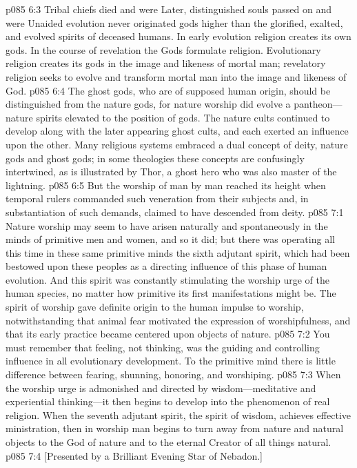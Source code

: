 \vs p085 6:3 Tribal chiefs died and were  Later, distinguished souls passed on and were  Unaided evolution never originated gods higher than the glorified, exalted, and evolved spirits of deceased humans. In early evolution religion creates its own gods. In the course of revelation the Gods formulate religion. Evolutionary religion creates its gods in the image and likeness of mortal man; revelatory religion seeks to evolve and transform mortal man into the image and likeness of God.
\vs p085 6:4 The ghost gods, who are of supposed human origin, should be distinguished from the nature gods, for nature worship did evolve a pantheon---nature spirits elevated to the position of gods. The nature cults continued to develop along with the later appearing ghost cults, and each exerted an influence upon the other. Many religious systems embraced a dual concept of deity, nature gods and ghost gods; in some theologies these concepts are confusingly intertwined, as is illustrated by Thor, a ghost hero who was also master of the lightning.
\vs p085 6:5 But the worship of man by man reached its height when temporal rulers commanded such veneration from their subjects and, in substantiation of such demands, claimed to have descended from deity.
\vs p085 7:1 Nature worship may seem to have arisen naturally and spontaneously in the minds of primitive men and women, and so it did; but there was operating all this time in these same primitive minds the sixth adjutant spirit, which had been bestowed upon these peoples as a directing influence of this phase of human evolution. And this spirit was constantly stimulating the worship urge of the human species, no matter how primitive its first manifestations might be. The spirit of worship gave definite origin to the human impulse to worship, notwithstanding that animal fear motivated the expression of worshipfulness, and that its early practice became centered upon objects of nature.
\vs p085 7:2 You must remember that feeling, not thinking, was the guiding and controlling influence in all evolutionary development. To the primitive mind there is little difference between fearing, shunning, honoring, and worshiping.
\vs p085 7:3 When the worship urge is admonished and directed by wisdom---meditative and experiential thinking---it then begins to develop into the phenomenon of real religion. When the seventh adjutant spirit, the spirit of wisdom, achieves effective ministration, then in worship man begins to turn away from nature and natural objects to the God of nature and to the eternal Creator of all things natural.
\vsetoff
\vs p085 7:4 [Presented by a Brilliant Evening Star of Nebadon.]
